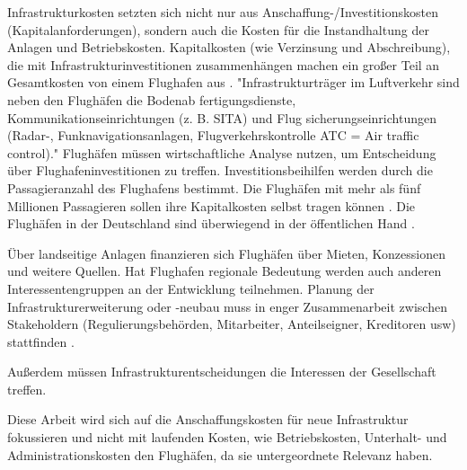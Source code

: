 Infrastrukturkosten setzten sich nicht nur aus Anschaffung-/Investitionskosten (Kapitalanforderungen), sondern auch die Kosten für die Instandhaltung der Anlagen und Betriebskosten.
Kapitalkosten (wie Verzinsung und Abschreibung), die mit Infrastrukturinvestitionen zusammenhängen machen ein großer Teil an Gesamtkosten von einem Flughafen aus \cite{wittmer2011aviation}.
"Infrastrukturträger im Luftverkehr sind neben den Flughäfen die Bodenab
fertigungsdienste, Kommunikationseinrichtungen (z. B. SITA) und Flug
sicherungseinrichtungen (Radar-, Funknavigationsanlagen, Flugverkehrskontrolle 
ATC = Air traffic control)."  %
%
Flughäfen müssen wirtschaftliche Analyse nutzen, um Entscheidung über Flughafeninvestitionen zu treffen. %
Investitionsbeihilfen werden durch die Passagieranzahl des Flughafens bestimmt. Die Flughäfen mit mehr als fünf Millionen Passagieren
sollen ihre Kapitalkosten selbst tragen können \cite{conrady2019luftverkehr}. 
Die Flughäfen in der Deutschland sind überwiegend in der öffentlichen Hand \cite{conrady2019luftverkehr}.

Über landseitige Anlagen finanzieren sich Flughäfen über Mieten, Konzessionen und weitere Quellen. %
Hat Flughafen regionale Bedeutung werden auch anderen Interessentengruppen an der Entwicklung teilnehmen.
Planung der Infrastrukturerweiterung oder -neubau muss in enger Zusammenarbeit 
zwischen Stakeholdern (Regulierungsbehörden, Mitarbeiter, Anteilseigner, Kreditoren usw) stattfinden \cite{wittmer2011aviation}.

Außerdem müssen Infrastrukturentscheidungen die Interessen der Gesellschaft treffen. %

Diese Arbeit wird sich auf die Anschaffungskosten für neue Infrastruktur fokussieren und nicht mit 
laufenden Kosten, wie Betriebskosten, Unterhalt- und Administrationskosten den Flughäfen, da sie untergeordnete Relevanz haben.

